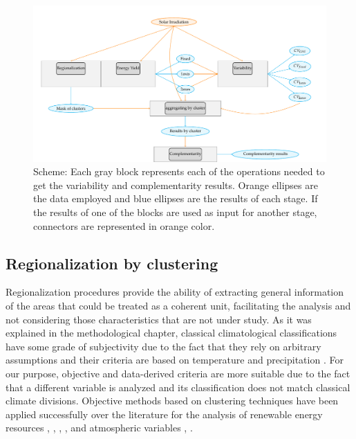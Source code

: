 \begin{figure}[h!]
\centering\includegraphics[width=1\textwidth]{figs/capitulo5/multi_step}
\caption[Stages of the multi-step scheme for variability and complementarity analysis]{Scheme: Each gray block represents each of the operations needed to get the variability and complementarity results. Orange ellipses are the data employed and blue ellipses are the results of each stage. If the results of one of the blocks are used as input for another stage, connectors are represented in orange color.}
\label{fig:multi_step}
\end{figure}

\subsection{Regionalization by clustering}

Regionalization procedures provide the ability of extracting general information of the areas that could be treated as a coherent unit, facilitating the analysis and not considering those characteristics that are not under study. As it was explained in the methodological chapter, classical climatological classifications have some grade of subjectivity due to the fact that they rely on arbitrary assumptions \cite*{Kottek2006} and their criteria are based on temperature and precipitation \cite*{trewartha1980koppen}. For our purpose, objective and data-derived criteria are more suitable due to the fact that a different variable is analyzed and its classification does not match classical climate divisions. Objective methods based on clustering techniques have been applied successfully over the literature for the analysis of renewable energy resources \cite*{Polo2015}, \cite*{Zagouras2013}, \cite*{Zagouras2014}, \cite*{Zagouras2014b}, \cite*{gomez2015characterization} and atmospheric variables \cite*{Argueso2011}, \cite*{garcia2012seasonal}. 

